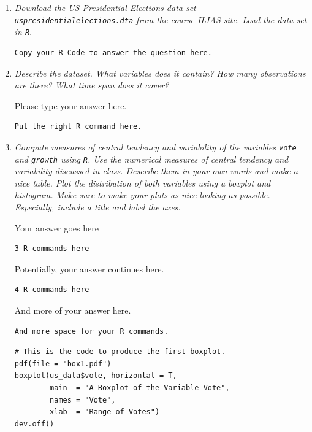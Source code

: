 \documentclass[a4paper,12pt]{article} %
\begin{document}
\begin{enumerate}

\item {\it Download the US Presidential Elections data set {\tt uspresidentialelections.dta} from the course ILIAS site. Load the data set in {\tt R}}. %

\begin{verbatim}
Copy your R Code to answer the question here.
\end{verbatim}

\item {\it Describe the dataset. What variables does it contain? How many observations are there? What time span does it cover?}

Please type your answer here.

\begin{verbatim}
Put the right R command here.
\end{verbatim}

\newpage %
\item {\it Compute measures of central tendency and variability of the variables {\tt vote} and {\tt growth} using {\tt R}. Use the numerical measures of central tendency and variability discussed in class. Describe them in your own words and make a nice table. Plot the distribution of both variables using a boxplot and histogram. Make sure to make your plots as nice-looking as possible. Especially, include a title and label the axes.}

Your answer goes here

\begin{verbatim}
3 R commands here
\end{verbatim}

Potentially, your answer continues here.

\begin{verbatim}
4 R commands here
\end{verbatim}

And more of your answer here.

\begin{verbatim}
And more space for your R commands.
\end{verbatim}

\begin{verbatim}
# This is the code to produce the first boxplot.
pdf(file = "box1.pdf")
boxplot(us_data$vote, horizontal = T,
        main  = "A Boxplot of the Variable Vote",
        names = "Vote",
        xlab  = "Range of Votes")
dev.off()
\end{verbatim}


\end{enumerate}
\end{document}
